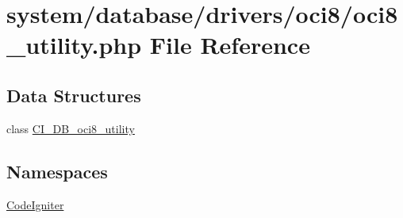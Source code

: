 \hypertarget{oci8__utility_8php}{\section{system/database/drivers/oci8/oci8\-\_\-utility.php File Reference}
\label{oci8__utility_8php}
}
\subsection*{Data Structures}
\begin{DoxyCompactItemize}
\item 
class \hyperlink{class_c_i___d_b__oci8__utility}{C\-I\-\_\-\-D\-B\-\_\-oci8\-\_\-utility}
\end{DoxyCompactItemize}
\subsection*{Namespaces}
\begin{DoxyCompactItemize}
\item 
\hyperlink{namespace_code_igniter}{Code\-Igniter}
\end{DoxyCompactItemize}
